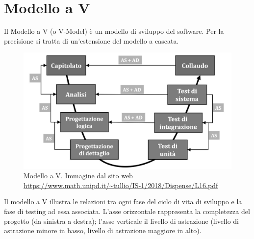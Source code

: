 \section{Modello a V}
\label{modelloV}

Il Modello a V (o V-Model) è un modello di sviluppo del software. Per la precisione si tratta di un'estensione del modello a cascata. 

\begin{figure}[H]
\centering
	\includegraphics[width=0.7\linewidth]{./images/modellov.jpg} 
	\caption{Modello a V. Immagine dal sito web \url{https://www.math.unipd.it/~tullio/IS-1/2018/Dispense/L16.pdf}}
	\label{vmodel}
\end{figure}

Il modello a V illustra le relazioni tra ogni fase del ciclo di vita di sviluppo e la fase di testing ad essa associata. L'asse orizzontale rappresenta la completezza del progetto (da sinistra a destra); l'asse verticale il livello di astrazione (livello di astrazione minore in basso, livello di astrazione maggiore in alto).


